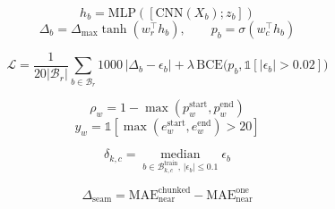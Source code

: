 \begin{equation}
h_b=\mathrm{MLP}([\mathrm{CNN}(X_b);z_b])
\label{eq:brqe-h}
\end{equation}
\begin{equation}
\Delta_b=\Delta_{\max}\tanh(w_r^{\top}h_b),\qquad
p_b=\sigma(w_c^{\top}h_b)
\label{eq:brqe}
\end{equation}

\begin{equation}
\mathcal{L}=\frac{1}{20\lvert\mathcal{B}_r\rvert}\sum_{b\in\mathcal{B}_r}1000\,\lvert\Delta_b-\epsilon_b\rvert
+\lambda\,\mathrm{BCE}\bigl(p_b,\mathbb{1}[\lvert\epsilon_b\rvert>0.02]\bigr)
\label{eq:loss}
\end{equation}

\begin{equation}
\rho_w = 1-\max(p_w^{\mathrm{start}},p_w^{\mathrm{end}})
\label{eq:reliability}
\end{equation}
\begin{equation}
y_w=\mathbb{1}[\max(e_w^{\mathrm{start}},e_w^{\mathrm{end}})>20]
\label{eq:label}
\end{equation}

\begin{equation}
\delta_{k,c}=\operatorname*{median}_{b\in\mathcal{B}^{\mathrm{train}}_{k,c},\,\lvert\epsilon_b\rvert\le 0.1}\epsilon_b
\label{eq:const}
\end{equation}

\begin{equation}
\Delta_{\mathrm{seam}}=\mathrm{MAE}^{\mathrm{chunked}}_{\mathrm{near}}-\mathrm{MAE}^{\mathrm{one}}_{\mathrm{near}}
\label{eq:seam}
\end{equation}
